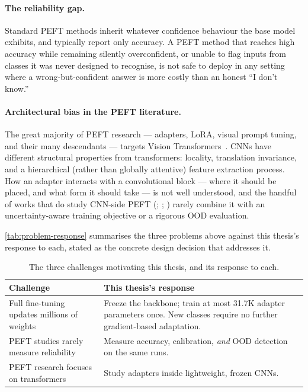 \documentclass{iutbscthesis}
\begin{document}
\paragraph{The reliability gap.} Standard PEFT methods inherit whatever confidence behaviour the base model exhibits, and typically report only accuracy. A PEFT method that reaches high accuracy while remaining silently overconfident, or unable to flag inputs from classes it was never designed to recognise, is not safe to deploy in any setting where a wrong-but-confident answer is more costly than an honest ``I don't know.''

\paragraph{Architectural bias in the PEFT literature.} The great majority of PEFT research — adapters, LoRA, visual prompt tuning, and their many descendants — targets Vision Transformers~\cite{jia2022vpt, chen2022adaptformer, jie2023fact, zhang2022noah, lian2022ssf}. CNNs have different structural properties from transformers: locality, translation invariance, and a hierarchical (rather than globally attentive) feature extraction process. How an adapter interacts with a convolutional block — where it should be placed, and what form it should take — is not well understood, and the handful of works that do study CNN-side PEFT (\textcite{chen2024convadapter}; \textcite{aleem2024convlora}; \textcite{zhong2024convlorasam}) rarely combine it with an uncertainty-aware training objective or a rigorous OOD evaluation.

\autoref{tab:problem-response} summarises the three problems above against this thesis's response to each, stated as the concrete design decision that addresses it.

\begin{table}[H]
    \centering
    \small
    \begin{tabular}{>{\raggedright\arraybackslash}p{5.5cm} >{\raggedright\arraybackslash}p{7cm}}
        \toprule
        Challenge & This thesis's response \\
        \midrule
        Full fine-tuning updates millions of weights & Freeze the backbone; train at most 31.7K adapter parameters once. New classes require no further gradient-based adaptation. \\
        PEFT studies rarely measure reliability & Measure accuracy, calibration, \emph{and} OOD detection on the same runs. \\
        PEFT research focuses on transformers & Study adapters inside lightweight, frozen CNNs. \\
        \bottomrule
    \end{tabular}
    \caption{The three challenges motivating this thesis, and its response to each.}
    \label{tab:problem-response}
\end{table}
\end{document}
